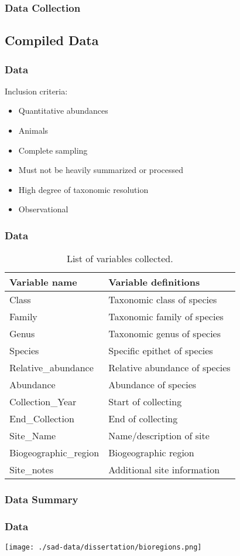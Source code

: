 \documentclass[14pt]{beamer}
\begin{document}
\subsubsection{Data Collection}
\subsection{Compiled Data}
\begin{frame}[t]{}
\frametitle{Data}
Inclusion criteria:
\begin{itemize}
\item Quantitative abundances
\item Animals
\item Complete sampling
\item Must not be heavily summarized or processed
\item High degree of taxonomic resolution
\item Observational
\end{itemize}
\end{frame}

\begin{frame}[shrink=30]
\frametitle{Data}
\begin{table}
\begin{tabular}{l|l} 
 Variable name & Variable definitions\\ 
\hline
 Class & Taxonomic class of species \\
 Family & Taxonomic family of species \\
 Genus & Taxonomic genus of species\\
 Species & Specific epithet of species  \\
 Relative\_abundance & Relative abundance of species \\
 Abundance & Abundance of species \\
 Collection\_Year & Start of collecting \\
 End\_Collection & End of collecting \\
 Site\_Name & Name/description of site \\
 Biogeographic\_region & Biogeographic region \\
 Site\_notes & Additional site information \\ 
\end{tabular}
\caption{List of variables collected.}
\end{table}
\end{frame}

\subsubsection{Data Summary}
\begin{frame}{}
\frametitle{Data}
\texttt{[image: ./sad-data/dissertation/bioregions.png]}
\end{frame}
\end{document}
